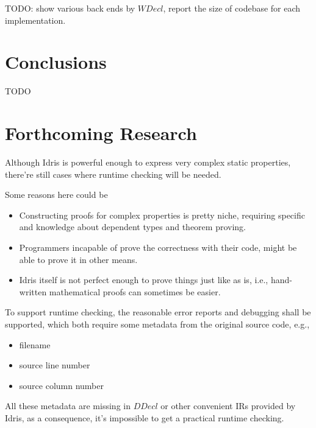 \documentclass[a1,portrait]{a1poster}
\begin{document}
\begin{multicols}{2}
TODO: show various back ends by $WDecl$, report the size of codebase for each implementation.


\section*{Conclusions}

TODO

\color{Black}

\section*{Forthcoming Research}

Although Idris is powerful enough to express very complex static properties,
there're still cases where runtime checking will be needed.

Some reasons here could be

\begin{itemize}
    \setlength\itemsep{-0.2em}
    \item Constructing proofs for complex properties is pretty niche, requiring specific and knowledge about dependent types and theorem proving.
    \item Programmers incapable of prove the correctness with their code, might be able to prove it in other means.
    \item Idris itself is not perfect enough to prove things just like as is, i.e., hand-written mathematical proofs can sometimes be easier.
\end{itemize}

To support runtime checking, the reasonable error reports and debugging shall be supported,
which both require some metadata from the original source code, e.g.,

\begin{itemize}
    \setlength\itemsep{-0.2em}
    \item filename
    \item source line number
    \item source column number
\end{itemize}

All these metadata are missing in $DDecl$ or other convenient IRs provided by Idris,
as a consequence, it's impossible to get a practical runtime checking.


\begin{small}%
\begin{multicols}{2}%
\nocite{*} %
\end{multicols}
\end{small}


\end{multicols}
\end{document}
